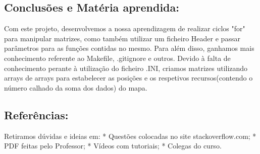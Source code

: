 \subsection*{Conclusões e Matéria aprendida\+:}

\begin{DoxyVerb}Com este projeto, desenvolvemos a nossa aprendizagem de realizar ciclos "for" para manipular matrizes, como também utilizar um ficheiro Header e passar parâmetros para as funções contidas no mesmo.
Para além disso, ganhamos mais conhecimento referente ao Makefile, .gitignore e outros. Devido à falta de conhecimento perante à utilização do ficheiro .INI, criamos matrizes utilizando arrays de arrays para estabelecer as posições e os respetivos recursos(contendo o número calhado da soma dos dados) do mapa.
\end{DoxyVerb}


\subsection*{Referências\+:}

\begin{DoxyVerb}Retiramos dúvidas e ideias em:
    * Questões colocadas no site stackoverflow.com;
    * PDF feitas pelo Professor;
    * Vídeos com tutoriais;
    * Colegas do curso.\end{DoxyVerb}
 